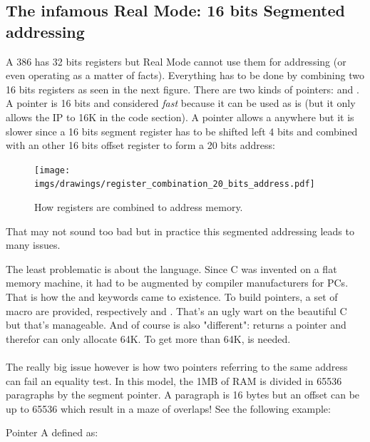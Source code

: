 \documentclass[book.tex]{subfiles}
\begin{document}
\subsection{The infamous Real Mode: 16 bits Segmented addressing}
A 386 has 32 bits registers but Real Mode cannot use them for addressing (or even operating as a matter of facts). Everything has to be done by combining two 16 bits registers as seen in the next figure. There are two kinds of pointers:  and . A  pointer is 16 bits and considered \emph{fast} because it can be used as is (but it only allows the IP to  16K in the code section). A  pointer allows a  anywhere but it is slower since a 16 bits segment register has to be shifted left 4 bits and combined with an other 16 bits offset register to form a 20 bits address:\\
\begin{figure}[H]
\centering
\texttt{[image: imgs/drawings/register\_combination\_20\_bits\_address.pdf]}
\caption{How registers are combined to address memory.}
\label{fig:register_comb_to_20_bits}
\end{figure}
That may not sound too bad but in practice this segmented addressing leads to many issues.\\
\par 
The least problematic is about the language. Since C was invented on a flat memory machine, it had to be augmented by compiler manufacturers for PCs. That is how the  and  keywords came to existence. To build pointers, a set of macro are provided, respectively  and . That's an ugly wart on the beautiful C but that's manageable. And of course  is also "different":  returns a  pointer and therefor can only allocate 64K. To get more than 64K,  is needed.\\
\\
The really big issue however is how two pointers referring to the same address can fail an equality test. In this model, the 1MB of RAM is divided in 65536 paragraphs by the segment pointer. A paragraph is 16 bytes but an offset can be up to 65536 which result in a maze of overlaps! See the following example:\\
\par
Pointer A defined as:\\
\par
\begin{minipage}{\textwidth}

\end{minipage}
\end{document}
